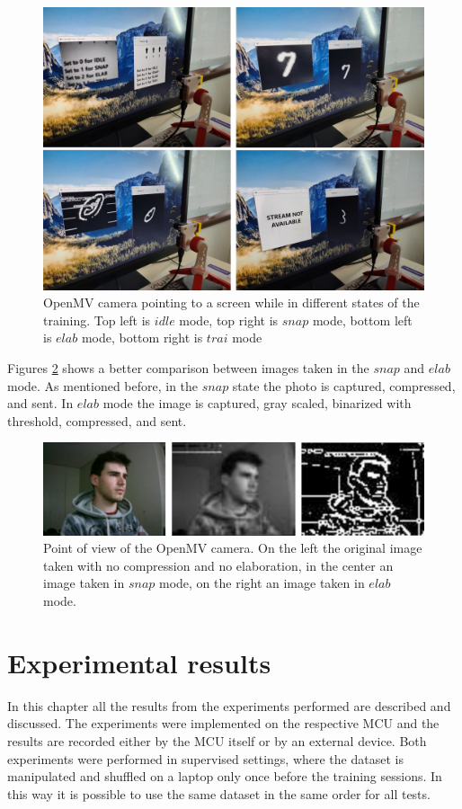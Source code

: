 \documentclass[12pt]{report}
\begin{document}
\begin{figure}[h!]
    \centering
    \includegraphics[width=130mm]{Figures/Chapter4/openmv_training.jpg} 
    \caption{OpenMV camera pointing to a screen while in different states of the training. Top left is $idle$ mode, top right is $snap$ mode, bottom left is $elab$ mode, bottom right is $trai$ mode}
    \label{fig:openmv_training}    
\end{figure}

Figures \ref{fig:openmv_pov} shows a better comparison between images taken in the $snap$ and $elab$ mode. As mentioned before, in the $snap$ state the photo is captured, compressed, and sent. In $elab$ mode the image is captured, gray scaled, binarized with threshold, compressed, and sent.

\begin{figure}[h!]
    \centering
    \includegraphics[width=140mm]{Figures/Chapter4/openmv_pov.jpg} 
    \caption{Point of view of the OpenMV camera. On the left the original image taken with no compression and no elaboration, in the center an image taken in $snap$ mode, on the right an image taken in $elab$ mode.}
    \label{fig:openmv_pov}    
\end{figure}


\chapter{Experimental results} 
In this chapter all the results from the experiments performed are described and discussed. The experiments were implemented on the respective MCU and the results are recorded either by the MCU itself or by an external device. Both experiments were performed in supervised settings, where the dataset is manipulated and shuffled on a laptop only once before the training sessions. In this way it is possible to use the same dataset in the same order for all tests.
\end{document}
